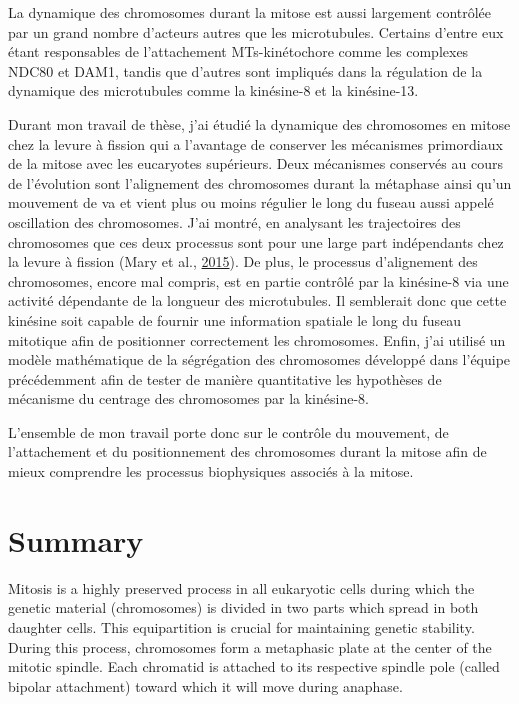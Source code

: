 \documentclass[12pt,a4paper,twoside,openright]{book}
\begin{document}
La dynamique des chromosomes durant la mitose est aussi largement
contrôlée par un grand nombre d'acteurs autres que les microtubules.
Certains d'entre eux étant responsables de l'attachement MTs-kinétochore
comme les complexes NDC80 et DAM1, tandis que d'autres sont impliqués
dans la régulation de la dynamique des microtubules comme la kinésine-8
et la kinésine-13.

Durant mon travail de thèse, j'ai étudié la dynamique des chromosomes en
mitose chez la levure à fission qui a l'avantage de conserver les
mécanismes primordiaux de la mitose avec les eucaryotes supérieurs. Deux
mécanismes conservés au cours de l'évolution sont l'alignement des
chromosomes durant la métaphase ainsi qu'un mouvement de va et vient
plus ou moins régulier le long du fuseau aussi appelé oscillation des
chromosomes. J'ai montré, en analysant les trajectoires des chromosomes
que ces deux processus sont pour une large part indépendants chez la
levure à fission (Mary et al., \protect\hyperlink{ref-Mary2015}{2015}).
De plus, le processus d'alignement des chromosomes, encore mal compris,
est en partie contrôlé par la kinésine-8 via une activité dépendante de
la longueur des microtubules. Il semblerait donc que cette kinésine soit
capable de fournir une information spatiale le long du fuseau mitotique
afin de positionner correctement les chromosomes. Enfin, j'ai utilisé un
modèle mathématique de la ségrégation des chromosomes développé dans
l'équipe précédemment afin de tester de manière quantitative les
hypothèses de mécanisme du centrage des chromosomes par la kinésine-8.

L'ensemble de mon travail porte donc sur le contrôle du mouvement, de
l'attachement et du positionnement des chromosomes durant la mitose afin
de mieux comprendre les processus biophysiques associés à la mitose.

\cleardoublepage
\clearpage\null

\section*{Summary}

Mitosis is a highly preserved process in all eukaryotic cells during
which the genetic material (chromosomes) is divided in two parts which
spread in both daughter cells. This equipartition is crucial for
maintaining genetic stability. During this process, chromosomes form a
metaphasic plate at the center of the mitotic spindle. Each chromatid is
attached to its respective spindle pole (called bipolar attachment)
toward which it will move during anaphase.
\end{document}

